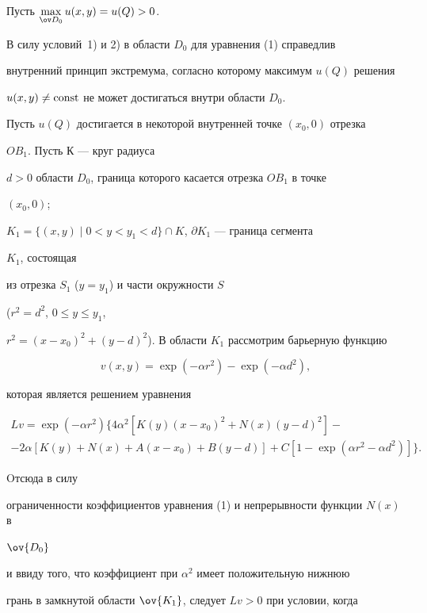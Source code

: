 \begin{pf}


Пусть $\max\limits_{\ov D_0}u(x,y)=u(Q)>0$.


В силу условий~1) и 2) в области $D_0$ для уравнения (1) справедлив 


внутренний принцип экстремума, согласно которому максимум $u(Q)$ решения 


$u(x,y)\ne\operatorname{const}$ не может достигаться внутри области $D_0$. 


Пусть $u(Q)$ достигается в некоторой внутренней точке $(x_0,0)$ отрезка


$OB_1$. Пусть $К$ --- круг радиуса 


$d>0$ области $D_0$, граница которого касается отрезка $OB_1$ в точке 


$(x_0,0)$;


$K_1=\{(x,y)\mid 0<y<y_1<d\}\cap K$, $\partial K_1$ --- граница сегмента


$K_1$, состоящая 


из отрезка $S_1$ ($y=y_1$) и части окружности $S$


($r^2=d^2$, $0\le y\le y_1$,


$r^2=(x-x_0)^2+(y-d)^2$). В области $K_1$ рассмотрим барьерную функцию 


$$


v(x,y)=\exp(-\alpha r^2)-\exp (-\alpha d^2),


$$


которая является решением уравнения


\begin{multline*}


Lv=\exp (-\alpha r^2)\{4\alpha^2[K(y)(x-x_0)^2+


N(x)(y-d)^2]-\\


%


-2\alpha[K(y)+N(x)+A(x-x_0)+B(y-d)]+


C[1-\exp(\alpha r^2-\alpha d^2)]\}.


\end{multline*}


Oтсюда в силу 


ограниченности коэффициентов уравнения (1) и непрерывности функции $N(x)$ в


$\ov {D_0}$ 


и ввиду того, что коэффициент при $\alpha^2$ имеет положительную нижнюю 


грань в замкнутой области $\ov {K_1}$, следует $Lv>0$ при условии, когда



\end{pf}
